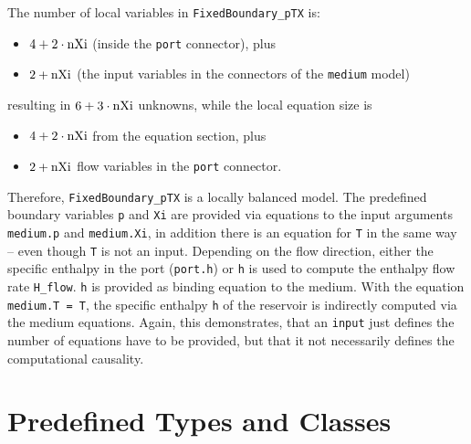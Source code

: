\begin{example}
The number of local variables in \lstinline!FixedBoundary_pTX! is:
\begin{itemize}
\item
  $4 + 2 \cdot \text{\lstinline!nXi!}$ (inside the \lstinline!port! connector), plus
\item
  $2 + \text{\lstinline!nXi!}$ (the input variables in the connectors of the \lstinline!medium! model)
\end{itemize}
resulting in $6 + 3 \cdot \text{\lstinline!nXi!}$ unknowns, while the local equation size is
\begin{itemize}
\item
  $4 + 2 \cdot \text{\lstinline!nXi!}$ from the equation section, plus
\item
  $2 + \text{\lstinline!nXi!}$ flow variables in the \lstinline!port! connector.
\end{itemize}

Therefore, \lstinline!FixedBoundary_pTX! is a locally balanced model.  The predefined boundary variables \lstinline!p! and \lstinline!Xi! are
provided via equations to the input arguments \lstinline!medium.p! and \lstinline!medium.Xi!, in addition there is an equation for \lstinline!T!
in the same way -- even though \lstinline!T! is not an input.  Depending on the flow direction, either the specific enthalpy in the port
(\lstinline!port.h!) or \lstinline!h! is used to compute the enthalpy flow rate \lstinline!H_flow!.  \lstinline!h! is provided as binding equation
to the medium.  With the equation \lstinline!medium.T = T!, the specific enthalpy \lstinline!h! of the reservoir is indirectly computed via the
medium equations.  Again, this demonstrates, that an \lstinline!input! just defines the number of equations have to be provided, but that it not
necessarily defines the computational causality.
\end{example}

\section{Predefined Types and Classes}\label{predefined-types-and-classes}


